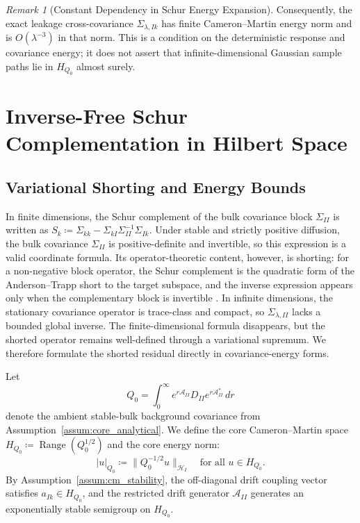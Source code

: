 \documentclass[preprint,12pt]{elsarticle}
\theoremstyle{plain}
\theoremstyle{definition}
\theoremstyle{remark}
\newtheorem{remark}[theorem]{Remark}
\newcommand{\Range}{\operatorname{Range}}
\begin{document}
    \begin{remark}[Constant Dependency in Schur Energy Expansion]
        Consequently, the exact leakage cross-covariance
        $\Sigma_{\lambda,Ik}$ has finite Cameron--Martin energy norm and is
        $O(\lambda^{-3})$ in that norm.  This is a condition on the deterministic
        response and covariance energy; it does not assert that infinite-dimensional
        Gaussian sample paths lie in $H_{Q_0}$ almost surely.
    \end{remark}

    \section{Inverse-Free Schur Complementation in Hilbert Space}
    \label{sec:infdim}

    \subsection{Variational Shorting and Energy Bounds}
    \label{sec:infdim:variational}

    In finite dimensions, the Schur complement of the bulk covariance block
    $\Sigma_{II}$ is written as
    $S_k \coloneqq \Sigma_{kk} - \Sigma_{kI}\Sigma_{II}^{-1}\Sigma_{Ik}$.
    Under stable and strictly positive diffusion, the bulk covariance
    $\Sigma_{II}$ is positive-definite and invertible, so this expression is a
    valid coordinate formula.  Its operator-theoretic content, however, is
    shorting: for a non-negative block operator, the Schur complement is the
    quadratic form of the Anderson--Trapp short to the target subspace, and the
    inverse expression appears only when the complementary block is invertible
    \cite{krein1947selfadjoint,anderson1975shorted}.  In infinite dimensions,
    the stationary covariance operator is trace-class and compact, so
    $\Sigma_{\lambda,II}$ lacks a bounded global inverse.  The finite-dimensional
    formula disappears, but the shorted operator remains well-defined through a
    variational supremum.  We therefore formulate the shorted residual directly
    in covariance-energy forms.

    Let
    \[
    Q_0
    =
    \int_0^\infty e^{r\mathcal A_{II}}D_{II}e^{r\mathcal A_{II}^*}\,dr
    \]
    denote the ambient stable-bulk background covariance from Assumption~\ref{assum:core_analytical}. We define the core Cameron--Martin space $H_{Q_0} \coloneqq \Range(Q_0^{1/2})$ and the core energy norm:
    \begin{equation}
        |u|_{Q_0} \coloneqq \|Q_0^{-1/2} u\|_{\mathcal{H}_I} \quad \text{for all } u \in H_{Q_0}.
    \end{equation}
    By Assumption~\ref{assum:cm_stability}, the off-diagonal drift coupling vector satisfies $a_{Ik} \in H_{Q_0}$, and the restricted drift generator $\mathcal{A}_{II}$ generates an exponentially stable semigroup on $H_{Q_0}$.
\end{document}
